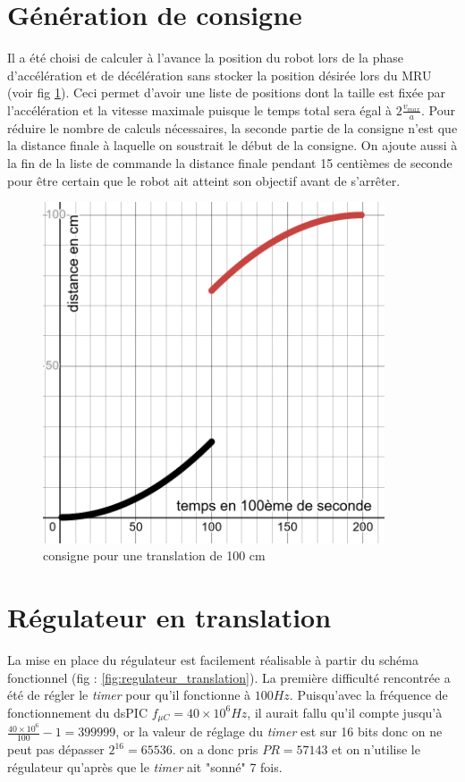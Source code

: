 \section{Génération de consigne}
\label{chap:consigne}
Il a été choisi de calculer à l'avance la position du robot lors de la phase d'accélération et de décélération sans stocker la position désirée lors du MRU (voir fig \ref{consigne}). Ceci permet d'avoir une liste de positions dont la taille est fixée par l'accélération et la vitesse maximale puisque le temps total sera égal à $2\frac{v_{max}}{a}$. Pour réduire le nombre de calculs nécessaires, la seconde partie de la consigne n'est que la distance finale à laquelle on soustrait le début de la consigne. On ajoute aussi à la fin de la liste de commande la distance finale pendant 15 centièmes de seconde pour être certain que le robot ait atteint son objectif avant de s'arrêter.

\begin{figure}[H]
    \centering
    \includegraphics[width=0.9\textwidth]{Pictures/consigne.png}
    \caption{consigne pour une translation de 100 cm}
    \label{consigne}
\end{figure}

\section{Régulateur en translation}

La mise en place du régulateur est facilement réalisable à partir du schéma fonctionnel (fig : \ref{fig:regulateur_translation}). La première difficulté rencontrée a été de régler le \textit{timer} pour qu'il fonctionne à $100Hz$. Puisqu'avec la fréquence de fonctionnement du dsPIC $f_{\mu C} = 40\times10^6 Hz$, il aurait fallu qu'il compte jusqu'à $\frac{40\times10^6}{100}-1 = 399999$, or la valeur de réglage du \textit{timer} est sur 16 bits donc on ne peut pas dépasser $2^{16} = 65536$. on a donc pris $PR = 57143$ et on n'utilise le régulateur qu'après que le \textit{timer} ait "sonné" 7 fois.

